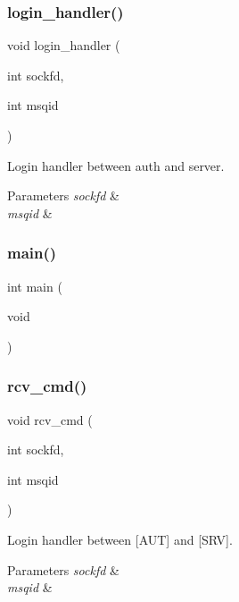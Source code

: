 \subsubsection{login\+\_\+handler()}
{\footnotesize\ttfamily void login\+\_\+handler (\begin{DoxyParamCaption}\item[{int}]{sockfd,  }\item[{int}]{msqid }\end{DoxyParamCaption})}



Login handler between auth and server. 


\begin{DoxyParams}{Parameters}
{\em sockfd} & \\
\hline
{\em msqid} & \\
\hline
\end{DoxyParams}
\mbox{\label{server_8c_ae66f6b31b5ad750f1fe042a706a4e3d4}} 
\subsubsection{main()}
{\footnotesize\ttfamily int main (\begin{DoxyParamCaption}\item[{void}]{ }\end{DoxyParamCaption})}

\mbox{\label{server_8c_abccdfc478d69333f46803552eba43cbb}} 
\subsubsection{rcv\+\_\+cmd()}
{\footnotesize\ttfamily void rcv\+\_\+cmd (\begin{DoxyParamCaption}\item[{int}]{sockfd,  }\item[{int}]{msqid }\end{DoxyParamCaption})}



Login handler between [A\+UT] and [S\+RV]. 


\begin{DoxyParams}{Parameters}
{\em sockfd} & \\
\hline
{\em msqid} & \\
\hline
\end{DoxyParams}
\mbox{\label{server_8c_ad26b08974642b47dc5bf48289824f655}} 
